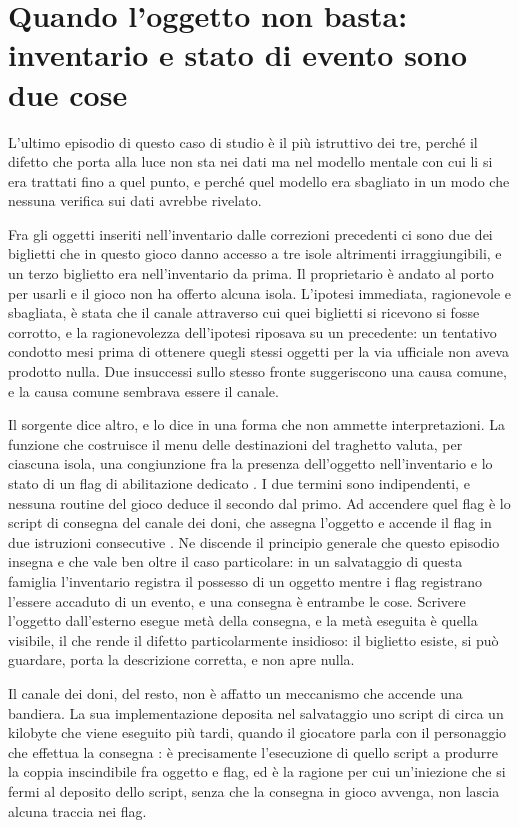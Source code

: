 \section{Quando l'oggetto non basta: inventario e stato di evento sono due cose}

L'ultimo episodio di questo caso di studio è il più istruttivo dei tre, perché il difetto che porta alla luce non sta nei dati ma nel modello mentale con cui li si era trattati fino a quel punto, e perché quel modello era sbagliato in un modo che nessuna verifica sui dati avrebbe rivelato.

Fra gli oggetti inseriti nell'inventario dalle correzioni precedenti ci sono due dei biglietti che in questo gioco danno accesso a tre isole altrimenti irraggiungibili, e un terzo biglietto era nell'inventario da prima. Il proprietario è andato al porto per usarli e il gioco non ha offerto alcuna isola. L'ipotesi immediata, ragionevole e sbagliata, è stata che il canale attraverso cui quei biglietti si ricevono si fosse corrotto, e la ragionevolezza dell'ipotesi riposava su un precedente: un tentativo condotto mesi prima di ottenere quegli stessi oggetti per la via ufficiale non aveva prodotto nulla. Due insuccessi sullo stesso fronte suggeriscono una causa comune, e la causa comune sembrava essere il canale.

Il sorgente dice altro, e lo dice in una forma che non ammette interpretazioni. La funzione che costruisce il menu delle destinazioni del traghetto valuta, per ciascuna isola, una congiunzione fra la presenza dell'oggetto nell'inventario e lo stato di un flag di abilitazione dedicato \cite{pokeemerald}. I due termini sono indipendenti, e nessuna routine del gioco deduce il secondo dal primo. Ad accendere quel flag è lo script di consegna del canale dei doni, che assegna l'oggetto e accende il flag in due istruzioni consecutive \cite{pokeemerald}. Ne discende il principio generale che questo episodio insegna e che vale ben oltre il caso particolare: in un salvataggio di questa famiglia l'inventario registra il possesso di un oggetto mentre i flag registrano l'essere accaduto di un evento, e una consegna è entrambe le cose. Scrivere l'oggetto dall'esterno esegue metà della consegna, e la metà eseguita è quella visibile, il che rende il difetto particolarmente insidioso: il biglietto esiste, si può guardare, porta la descrizione corretta, e non apre nulla.

Il canale dei doni, del resto, non è affatto un meccanismo che accende una bandiera. La sua implementazione deposita nel salvataggio uno script di circa un kilobyte che viene eseguito più tardi, quando il giocatore parla con il personaggio che effettua la consegna \cite{gen-iii-event-patcher}: è precisamente l'esecuzione di quello script a produrre la coppia inscindibile fra oggetto e flag, ed è la ragione per cui un'iniezione che si fermi al deposito dello script, senza che la consegna in gioco avvenga, non lascia alcuna traccia nei flag.

